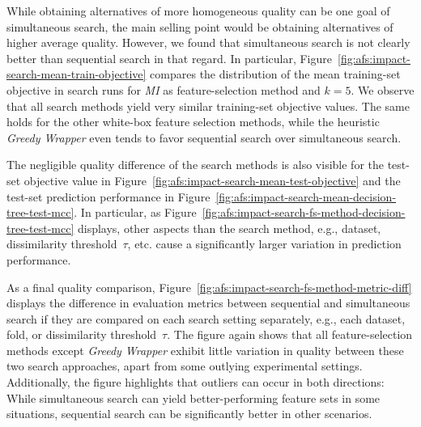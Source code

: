 \documentclass{article}
\theoremstyle{definition}
\begin{document}
While obtaining alternatives of more homogeneous quality can be one goal of simultaneous search, the main selling point would be obtaining alternatives of higher average quality.
However, we found that simultaneous search is not clearly better than sequential search in that regard.
In particular, Figure~\ref{fig:afs:impact-search-mean-train-objective} compares the distribution of the mean training-set objective in search runs for \emph{MI} as feature-selection method and $k=5$.
We observe that all search methods yield very similar training-set objective values.
The same holds for the other white-box feature selection methods, while the heuristic \emph{Greedy Wrapper} even tends to favor sequential search over simultaneous search.

The negligible quality difference of the search methods is also visible for the test-set objective value in Figure~\ref{fig:afs:impact-search-mean-test-objective} and the test-set prediction performance in Figure~\ref{fig:afs:impact-search-mean-decision-tree-test-mcc}.
In particular, as Figure~\ref{fig:afs:impact-search-fs-method-decision-tree-test-mcc} displays, other aspects than the search method, e.g., dataset, dissimilarity threshold~$\tau$, etc. cause a significantly larger variation in prediction performance.

As a final quality comparison, Figure~\ref{fig:afs:impact-search-fs-method-metric-diff} displays the difference in evaluation metrics between sequential and simultaneous search if they are compared on each search setting separately, e.g., each dataset, fold, or dissimilarity threshold~$\tau$.
The figure again shows that all feature-selection methods except \emph{Greedy Wrapper} exhibit little variation in quality between these two search approaches, apart from some outlying experimental settings.
Additionally, the figure highlights that outliers can occur in both directions:
While simultaneous search can yield better-performing feature sets in some situations, sequential search can be significantly better in other scenarios.
\end{document}
